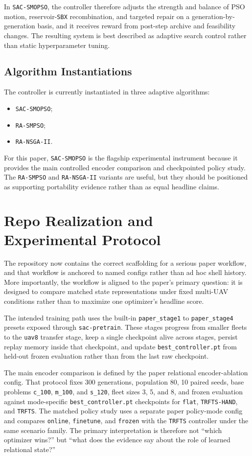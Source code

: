 \documentclass[a4paper,fleqn]{cas-sc}
\begin{document}
In \texttt{SAC-SMOPSO}, the controller therefore adjusts the strength and balance of PSO motion, reservoir-\texttt{SBX} recombination, and targeted repair on a generation-by-generation basis, and it receives reward from post-step archive and feasibility changes. The resulting system is best described as adaptive search control rather than static hyperparameter tuning.

\subsection{Algorithm Instantiations}

The controller is currently instantiated in three adaptive algorithms:
\begin{itemize}
\item \texttt{SAC-SMOPSO};
\item \texttt{RA-SMPSO};
\item \texttt{RA-NSGA-II}.
\end{itemize}

For this paper, \texttt{SAC-SMOPSO} is the flagship experimental instrument because it provides the main controlled encoder comparison and checkpointed policy study. The \texttt{RA-SMPSO} and \texttt{RA-NSGA-II} variants are useful, but they should be positioned as supporting portability evidence rather than as equal headline claims.

\section{Repo Realization and Experimental Protocol}

The repository now contains the correct scaffolding for a serious paper workflow, and that workflow is anchored to named configs rather than ad hoc shell history. More importantly, the workflow is aligned to the paper's primary question: it is designed to compare matched state representations under fixed multi-UAV conditions rather than to maximize one optimizer's headline score.

The intended training path uses the built-in \texttt{paper\_stage1} to \texttt{paper\_stage4} presets exposed through \texttt{sac-pretrain}. These stages progress from smaller fleets to the \texttt{uav8} transfer stage, keep a single checkpoint alive across stages, persist replay memory inside that checkpoint, and update \texttt{best\_controller.pt} from held-out frozen evaluation rather than from the last raw checkpoint.

The main encoder comparison is defined by the paper relational encoder-ablation config. That protocol fixes 300 generations, population 80, 10 paired seeds, base problems \texttt{c\_100}, \texttt{m\_100}, and \texttt{s\_120}, fleet sizes 3, 5, and 8, and frozen evaluation against mode-specific \texttt{best\_controller.pt} checkpoints for \texttt{flat}, \texttt{TRFTS-HAND}, and \texttt{TRFTS}. The matched policy study uses a separate paper policy-mode config and compares \texttt{online}, \texttt{finetune}, and \texttt{frozen} with the \texttt{TRFTS} controller under the same scenario family. The primary interpretation is therefore not ``which optimizer wins?'' but ``what does the evidence say about the role of learned relational state?''
\end{document}
